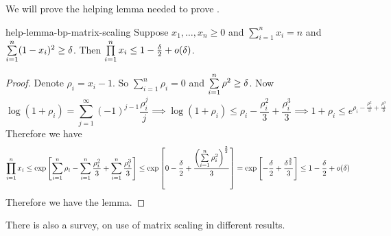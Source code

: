 \begin{algorithm}
	\DontPrintSemicolon
	\caption{}
\end{algorithm} We will prove the helping lemma needed to prove .

\begin{lemma}{}{help-lemma-bp-matrix-scaling}
	Suppose $x_1,\dots, x_n\geq 0$ and $\sum\limits_{i=1}^n x_i=n$ and $\sum\limits_{i=1}^n (1-x_i)^2\geq \delta$. Then $\prod\limits_{i=1}^n x_i\leq 1-\frac{\delta}2+o(\delta)$.
\end{lemma}
\begin{proof}
	Denote $\rho_i=x_i-1$. So $\sum\limits_{i=1}^n \rho_i=0$ and $\sum\limits_{i=1}^n \rho^2\geq \delta$. Now $$\log(1+\rho_i)=\sum_{j=1}^{\infty}(-1)^{j-1}\frac{\rho_i^j}{j}\implies \log(1+\rho_i)\leq \rho_i-\frac{\rho_i^2}3+\frac{\rho_i^3}3\implies 1+\rho_i\leq e^{\rho_i-\frac{\rho_i^2}3+\frac{\rho_i^3}3}$$Therefore we have $$\prod_{i=1}^n x_i\leq \exp\left[\sum_{i=1}^n \rho_i-\sum_{i=1}^n\frac{\rho_i^2}3+\sum_{i=1}^n\frac{\rho_i^3}3\right]\leq \exp\left[0-\frac{\delta}2+\frac{\left(\sum\limits_{i=1}^n\rho_i^2\right)^{\frac32} }3  \right]=\exp\left[-\frac{\delta}2+\frac{\delta^{\frac32}}3  \right]\leq 1-\frac{\delta}2+o(\delta)$$Therefore we have the lemma. 
\end{proof}

There is also a survey, \cite{Idel_2016_Aro} on use of matrix scaling in different results.

